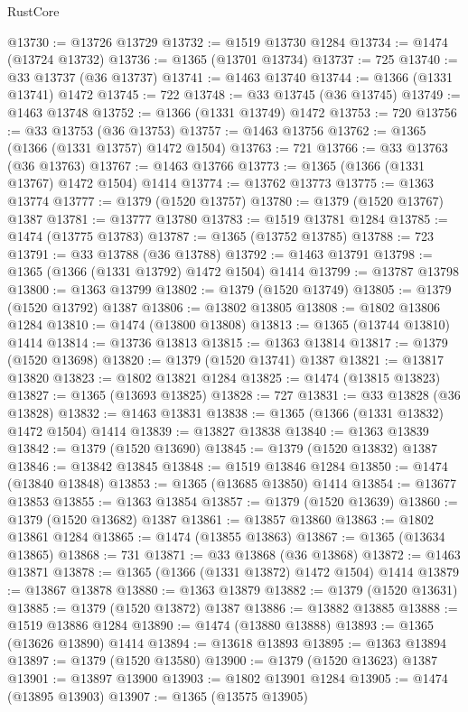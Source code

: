 \begin{lexlean}{RustCore}
\begin{coremodule}
@13730 := @13726 @13729
@13732 := @1519 @13730 @1284
@13734 := @1474 (@13724 @13732)
@13736 := @1365 (@13701 @13734)
@13737 := 725
@13740 := @33 @13737 (@36 @13737)
@13741 := @1463 @13740
@13744 := @1366 (@1331 @13741) @1472
@13745 := 722
@13748 := @33 @13745 (@36 @13745)
@13749 := @1463 @13748
@13752 := @1366 (@1331 @13749) @1472
@13753 := 720
@13756 := @33 @13753 (@36 @13753)
@13757 := @1463 @13756
@13762 := @1365 (@1366 (@1331 @13757) @1472 @1504)
@13763 := 721
@13766 := @33 @13763 (@36 @13763)
@13767 := @1463 @13766
@13773 := @1365 (@1366 (@1331 @13767) @1472 @1504) @1414
@13774 := @13762 @13773
@13775 := @1363 @13774
@13777 := @1379 (@1520 @13757)
@13780 := @1379 (@1520 @13767) @1387
@13781 := @13777 @13780
@13783 := @1519 @13781 @1284
@13785 := @1474 (@13775 @13783)
@13787 := @1365 (@13752 @13785)
@13788 := 723
@13791 := @33 @13788 (@36 @13788)
@13792 := @1463 @13791
@13798 := @1365 (@1366 (@1331 @13792) @1472 @1504) @1414
@13799 := @13787 @13798
@13800 := @1363 @13799
@13802 := @1379 (@1520 @13749)
@13805 := @1379 (@1520 @13792) @1387
@13806 := @13802 @13805
@13808 := @1802 @13806 @1284
@13810 := @1474 (@13800 @13808)
@13813 := @1365 (@13744 @13810) @1414
@13814 := @13736 @13813
@13815 := @1363 @13814
@13817 := @1379 (@1520 @13698)
@13820 := @1379 (@1520 @13741) @1387
@13821 := @13817 @13820
@13823 := @1802 @13821 @1284
@13825 := @1474 (@13815 @13823)
@13827 := @1365 (@13693 @13825)
@13828 := 727
@13831 := @33 @13828 (@36 @13828)
@13832 := @1463 @13831
@13838 := @1365 (@1366 (@1331 @13832) @1472 @1504) @1414
@13839 := @13827 @13838
@13840 := @1363 @13839
@13842 := @1379 (@1520 @13690)
@13845 := @1379 (@1520 @13832) @1387
@13846 := @13842 @13845
@13848 := @1519 @13846 @1284
@13850 := @1474 (@13840 @13848)
@13853 := @1365 (@13685 @13850) @1414
@13854 := @13677 @13853
@13855 := @1363 @13854
@13857 := @1379 (@1520 @13639)
@13860 := @1379 (@1520 @13682) @1387
@13861 := @13857 @13860
@13863 := @1802 @13861 @1284
@13865 := @1474 (@13855 @13863)
@13867 := @1365 (@13634 @13865)
@13868 := 731
@13871 := @33 @13868 (@36 @13868)
@13872 := @1463 @13871
@13878 := @1365 (@1366 (@1331 @13872) @1472 @1504) @1414
@13879 := @13867 @13878
@13880 := @1363 @13879
@13882 := @1379 (@1520 @13631)
@13885 := @1379 (@1520 @13872) @1387
@13886 := @13882 @13885
@13888 := @1519 @13886 @1284
@13890 := @1474 (@13880 @13888)
@13893 := @1365 (@13626 @13890) @1414
@13894 := @13618 @13893
@13895 := @1363 @13894
@13897 := @1379 (@1520 @13580)
@13900 := @1379 (@1520 @13623) @1387
@13901 := @13897 @13900
@13903 := @1802 @13901 @1284
@13905 := @1474 (@13895 @13903)
@13907 := @1365 (@13575 @13905)

\end{coremodule}
\end{lexlean}
